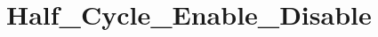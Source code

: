 \hypertarget{group___half___cycle___enable___disable}{\section{Half\-\_\-\-Cycle\-\_\-\-Enable\-\_\-\-Disable}
\label{group___half___cycle___enable___disable}
}
